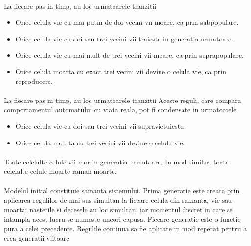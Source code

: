 \documentclass[11pt ,A4]{article}
\begin{document}
        \paragraph{} La fiecare pas in timp, au loc urmatoarele tranzitii
        \begin{itemize}
            \item Orice celula vie cu mai putin de doi vecini vii moare, ca prin subpopulare.
            \item Orice celula vie cu doi sau trei vecini vii traieste in generatia urmatoare.
            \item Orice celula vie cu mai mult de trei vecini vii moare, ca prin suprapopulare.
            \item Orice celula moarta cu exact trei vecini vii devine o celula vie, ca prin reproducere.
        \end{itemize}

        \paragraph{} La fiecare pas in timp, au loc urmatoarele tranzitii Aceste reguli, care compara comportamentul automatului cu viata reala, pot fi condensate in urmatoarele
        \begin{itemize}
            \item Orice celula vie cu doi sau trei vecini vii supravietuieste.
            \item Orice celula moarta cu trei vecini vii devine o celula vie.
        \end{itemize}

        \paragraph{} Toate celelalte celule vii mor in generatia urmatoare. In mod similar, toate celelalte celule moarte raman moarte.

        \paragraph{} Modelul initial constituie samanta sistemului. Prima generatie este creata prin aplicarea regulilor de mai sus simultan la fiecare celula din samanta, vie sau moarta; nasterile si decesele au loc simultan, iar momentul discret in care se intampla acest lucru se numeste uneori capusa. Fiecare generatie este o functie pura a celei precedente. Regulile continua sa fie aplicate in mod repetat pentru a crea generatii viitoare.
\end{document}
